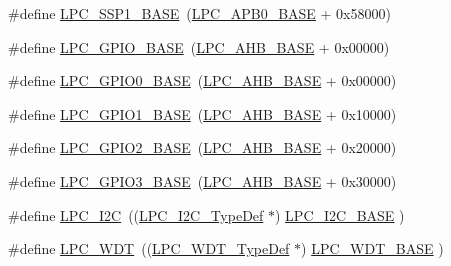 \begin{DoxyCompactItemize}
\item 
\#define \hyperlink{group___l_p_c11xx___definitions_ga05d118997f53f596d3a087f8b91a1969}{L\+P\+C\+\_\+\+S\+S\+P1\+\_\+\+B\+A\+SE}~(\hyperlink{group___l_p_c11xx___definitions_ga55cab996c3594a0f4cc459ec8e10daea}{L\+P\+C\+\_\+\+A\+P\+B0\+\_\+\+B\+A\+SE} + 0x58000)
\item 
\#define \hyperlink{group___l_p_c11xx___definitions_ga5feb4a6692784a25eaed627661bd8f36}{L\+P\+C\+\_\+\+G\+P\+I\+O\+\_\+\+B\+A\+SE}~(\hyperlink{group___l_p_c11xx___definitions_ga8e0d25ffe3428ed27f963e83089046a8}{L\+P\+C\+\_\+\+A\+H\+B\+\_\+\+B\+A\+SE}  + 0x00000)
\item 
\#define \hyperlink{group___l_p_c11xx___definitions_ga09e0e964ea1abf3b991772df2aa52405}{L\+P\+C\+\_\+\+G\+P\+I\+O0\+\_\+\+B\+A\+SE}~(\hyperlink{group___l_p_c11xx___definitions_ga8e0d25ffe3428ed27f963e83089046a8}{L\+P\+C\+\_\+\+A\+H\+B\+\_\+\+B\+A\+SE}  + 0x00000)
\item 
\#define \hyperlink{group___l_p_c11xx___definitions_ga9fb0536853721a3073bd69d94d0b7ec2}{L\+P\+C\+\_\+\+G\+P\+I\+O1\+\_\+\+B\+A\+SE}~(\hyperlink{group___l_p_c11xx___definitions_ga8e0d25ffe3428ed27f963e83089046a8}{L\+P\+C\+\_\+\+A\+H\+B\+\_\+\+B\+A\+SE}  + 0x10000)
\item 
\#define \hyperlink{group___l_p_c11xx___definitions_gae5524b2d728167194033ec7a1841a36b}{L\+P\+C\+\_\+\+G\+P\+I\+O2\+\_\+\+B\+A\+SE}~(\hyperlink{group___l_p_c11xx___definitions_ga8e0d25ffe3428ed27f963e83089046a8}{L\+P\+C\+\_\+\+A\+H\+B\+\_\+\+B\+A\+SE}  + 0x20000)
\item 
\#define \hyperlink{group___l_p_c11xx___definitions_ga56c68c5326b521b3278a35f4d81369a9}{L\+P\+C\+\_\+\+G\+P\+I\+O3\+\_\+\+B\+A\+SE}~(\hyperlink{group___l_p_c11xx___definitions_ga8e0d25ffe3428ed27f963e83089046a8}{L\+P\+C\+\_\+\+A\+H\+B\+\_\+\+B\+A\+SE}  + 0x30000)
\item 
\#define \hyperlink{group___l_p_c11xx___definitions_ga70a2faf2e119737f0e660984564d4907}{L\+P\+C\+\_\+\+I2C}~((\hyperlink{struct_l_p_c___i2_c___type_def}{L\+P\+C\+\_\+\+I2\+C\+\_\+\+Type\+Def}    $\ast$) \hyperlink{group___l_p_c11xx___definitions_ga9e53652929424015ade23fe30e1d022b}{L\+P\+C\+\_\+\+I2\+C\+\_\+\+B\+A\+SE}   )
\item 
\#define \hyperlink{group___l_p_c11xx___definitions_ga7d68cf0829652bd8c1f837c697653c5f}{L\+P\+C\+\_\+\+W\+DT}~((\hyperlink{struct_l_p_c___w_d_t___type_def}{L\+P\+C\+\_\+\+W\+D\+T\+\_\+\+Type\+Def}    $\ast$) \hyperlink{group___l_p_c11xx___definitions_ga02a30b0be4672972c3af9e5aebdcfea1}{L\+P\+C\+\_\+\+W\+D\+T\+\_\+\+B\+A\+SE}   )

\end{DoxyCompactItemize}
